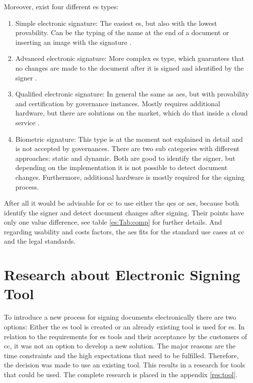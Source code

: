 Moreover, exist four different \gls{es} types:
\begin{enumerate}
	\item Simple electronic signature: The easiest \gls{es}, but also with the lowest provability. Can be the typing of the name at the end of a document or inserting an image with the signature \parencite{eIDAS2014,CEFd2018}.
	\item Advanced electronic signature: More complex \gls{es} type, which guarantees that no changes are made to the document after it is signed and identified by the signer \parencite{eIDAS2014}.
	\item Qualified electronic signature: In general the same as \gls{aes}, but with provability and certification by governance instances. Mostly requires additional hardware, but there are solutions on the market, which do that inside a cloud service \parencite{eIDAS2014,CEFd2018}.
	\item Biometric signature: This type is at the moment not explained in detail and is not accepted by governances. There are two sub categories with different approaches: static and dynamic. Both are good to identify the signer, but depending on the implementation it is not possible to detect document changes. Furthermore, additional hardware is mostly required for the signing process.
\end{enumerate}

After all it would be advisable for \gls{cc} to use either the \gls{qes} or \gls{aes}, because both identify the signer and detect document changes after signing. Their points have only one value difference, see table \ref{es:Tab:comp} for further details. And regarding usability and costs factors, the \gls{aes} fits for the standard use cases at \gls{cc} and the legal standards.

\section{Research about Electronic Signing Tool} \label{sec:researchTool}
To introduce a new process for signing documents electronically there are two options: Either the \gls{es} tool is created or an already existing tool is used for \gls{es}. In relation to the requirements for \gls{es} tools and their acceptance by the customers of \gls{cc}, it was not an option to develop a new solution. The major reasons are the time constraints and the high expectations that need to be fulfilled. Therefore, the decision was made to use an existing tool. This results in a research for tools that could be used. The complete research is placed in the appendix \ref{res:tool}. 

